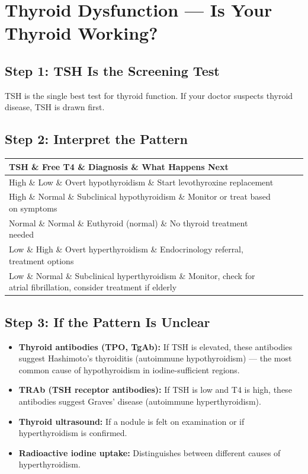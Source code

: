 \clearpage
\section{Thyroid Dysfunction --- Is Your Thyroid Working?}

\subsection{Step 1: TSH Is the Screening Test}

TSH is the single best test for thyroid function. If your doctor suspects thyroid disease, TSH is drawn first.

\subsection{Step 2: Interpret the Pattern}

\begin{longtable}{@{}llll@{}}
\toprule
\textbf{TSH} \& \textbf{Free T4} \& \textbf{Diagnosis} \& \textbf{What Happens Next} \\
\midrule
High \& Low \& Overt hypothyroidism \& Start levothyroxine replacement \\
High \& Normal \& Subclinical hypothyroidism \& Monitor or treat based on symptoms \\
Normal \& Normal \& Euthyroid (normal) \& No thyroid treatment needed \\
Low \& High \& Overt hyperthyroidism \& Endocrinology referral, treatment options \\
Low \& Normal \& Subclinical hyperthyroidism \& Monitor, check for atrial fibrillation, consider treatment if elderly \\
\bottomrule
\end{longtable}

\subsection{Step 3: If the Pattern Is Unclear}

\begin{itemize}
    \item \textbf{Thyroid antibodies (TPO, TgAb):} If TSH is elevated, these antibodies suggest Hashimoto's thyroiditis (autoimmune hypothyroidism) --- the most common cause of hypothyroidism in iodine-sufficient regions.
    \item \textbf{TRAb (TSH receptor antibodies):} If TSH is low and T4 is high, these antibodies suggest Graves' disease (autoimmune hyperthyroidism).
    \item \textbf{Thyroid ultrasound:} If a nodule is felt on examination or if hyperthyroidism is confirmed.
    \item \textbf{Radioactive iodine uptake:} Distinguishes between different causes of hyperthyroidism.
\end{itemize}

